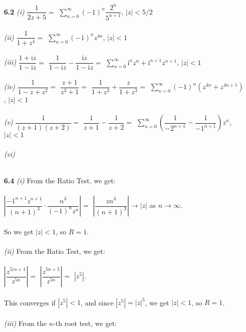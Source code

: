 \begin{enumerate}

\item[\textbf{6.2}] 
\textit{(i)}
$\dfrac{1}{2z+5}=$
$\displaystyle\sum\limits_{n=0}^\infty (-1)^n\dfrac{2^n}{5^{n+1}}$, $|z| < 5/2$
\\\\
\textit{(ii)}
$\dfrac{1}{1+z^4}=$
$\displaystyle\sum\limits_{n=0}^\infty (-1)^nz^{4n}$, $|z| < 1$
\\\\
\textit{(iii)}
$\dfrac{1+\mathrm{i}z}{1-\mathrm{i}z}=$
$\dfrac{1}{1-\mathrm{i}z} - \dfrac{\mathrm{i}z}{1-\mathrm{i}z}=$
$\displaystyle\sum\limits_{n=0}^\infty
\mathrm{i}^nz^n+\mathrm{i}^{n+1}z^{n+1}$, $|z| < 1$
\\\\
\textit{(iv)}
$\dfrac{1}{1-z+z^2}=$
$\dfrac{z+1}{z^3+1}=$
$\dfrac{1}{1+z^3}+\dfrac{z}{1+z^3}=$
$\displaystyle\sum\limits_{n=0}^\infty 
(-1)^n\left(z^{4n}+z^{4n+1}\right)$, $|z| < 1$
\\\\
\textit{(v)}
$\dfrac{1}{(z+1)(z+2)}=$
$\dfrac{1}{z+1} - \dfrac{1}{z+2}=$
$\displaystyle\sum\limits_{n=0}^\infty 
\left(\dfrac{1}{-2^{n+1}}-\dfrac{1}{-1^{n+1}}\right)z^n$, $|z| < 1$
\\\\
\textit{(vi)}
\\\\
\item[\textbf{6.4}] 
\textit{(i)}
From the Ratio Test, we get: \\\\
$\left|\dfrac{-1^{n+1}z^{n+1}}{(n+1)^3}\cdot\dfrac{n^3}{(-1)^nz^n}\right|=$
$\left|\dfrac{zn^3}{(n+1)^3}\right|\rightarrow|z|$ as $n\rightarrow\infty$.\\\\
So we get $|z|<1$, so $R=1$.
\\\\
\textit{(ii)}
From the Ratio Test, we get: \\\\
$\left|\dfrac{z^{5(n+1}}{z^{5n}}\right|=$
$\left|\dfrac{z^{5n+5}}{z^{5n}}\right|=$
$\left|z^5\right|$.\\\\
This converges if $|z^5|<1$, and since $|z^5| = |z|^5$, we get $|z| < 1$, so $R=1$.
\\\\
\textit{(iii)}
From the $n$-th root test, we get: \\\\

\end{enumerate}
